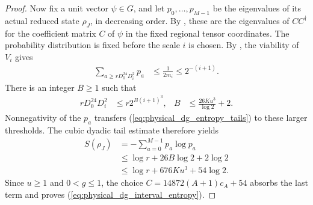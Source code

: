 \begin{proof}
    Now fix a unit vector $\psi\in G$, and let $p_0,\ldots,p_{M-1}$ be the
    eigenvalues of its actual reduced state $\rho_J$, in decreasing order.
    By \cite[``The actual regional marginal in tensor coordinates'']{QICLean2026Blueprint},
    these are the eigenvalues of $CC^\dagger$ for the coefficient matrix $C$
    of $\psi$ in the fixed regional tensor coordinates.
    The probability distribution is fixed before the scale $i$ is chosen.
    By \cite[``One spectral distribution for all viable approximations'']{QICLean2026Blueprint},
    the viability of $V_i$ gives
    \begin{align}
        \sum_{a\ge rD_0^{24}D_i^2}p_a
         & \le\frac{1}{2m_i}\le2^{-(i+1)}.
        \label{eq:physical_dg_entropy_tails}
    \end{align}
    There is an integer $B\ge1$ such that
    \begin{align*}
        rD_0^{24}D_i^2 & \le r2^{B(i+1)^3},
                       & B                  & \le\frac{26Ku^3}{\log2}+2.
    \end{align*}
    Nonnegativity of the $p_a$ transfers
    (\ref{eq:physical_dg_entropy_tails}) to these larger thresholds.
    The cubic dyadic tail estimate therefore yields
    \begin{align*}
        S(\rho_J)
         & =-\sum_{a=0}^{M-1}p_a\log p_a \\
         & \le\log r+26B\log2+2\log2     \\
         & \le\log r+676Ku^3+54\log2.
    \end{align*}
    Since $u\ge1$ and $0<g\le1$, the choice
    $C=14872(A+1)c_A+54$ absorbs the last term and proves
    (\ref{eq:physical_dg_interval_entropy}).
\end{proof}
